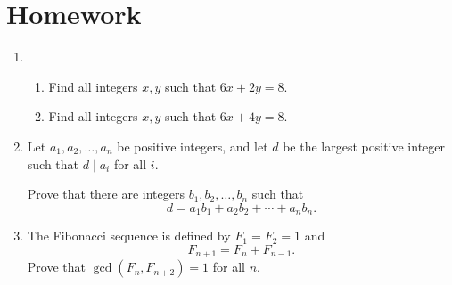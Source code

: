 \documentclass{article}
\begin{document}
\section{Homework}
  \begin{enumerate}
    \item
      \begin{enumerate}
        \item Find all integers $x,y$ such that $6x+2y=8$.
        \item Find all integers $x,y$ such that $6x+4y=8$.
      \end{enumerate}
    \item Let $a_1,a_2,\ldots,a_n$ be positive integers, and let $d$ be the
      largest positive integer such that $d\mid a_i$ for all $i$.

      Prove that there are integers $b_1,b_2,\ldots,b_n$ such that
      \[d=a_1b_1+a_2b_2+\cdots+a_n b_n.\]
    \item The Fibonacci sequence is defined by $F_1=F_2=1$ and
      \[F_{n+1}=F_n+F_{n-1}.\]
      Prove that $\gcd(F_n,F_{n+2})=1$ for all $n$.
  \end{enumerate}
\end{document}
